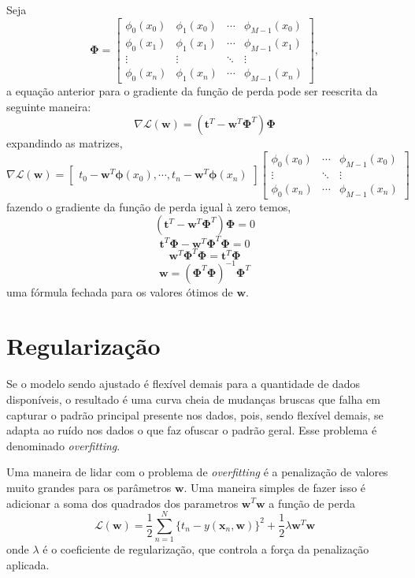 \documentclass{article}
\begin{document}
Seja
\[ \boldsymbol{\Phi} = \begin{bmatrix}
\phi_0(x_0) & \phi_1(x_0) & \dotsb & \phi_{M-1}(x_0) \\
\phi_0(x_1) & \phi_1(x_1) & \dotsb & \phi_{M-1}(x_1) \\
\vdots & \vdots & \ddots & \vdots \\
\phi_0(x_n) & \phi_1(x_n) & \dotsb & \phi_{M-1}(x_n)
\end{bmatrix},
\]
a equação anterior para o gradiente da função de perda pode ser reescrita da seguinte maneira:
\[
\nabla \mathcal{L}(\textbf{w}) = (\textbf{t}^T - \textbf{w}^T \boldsymbol{\Phi}^T) \boldsymbol{\Phi}
\]
expandindo as matrizes,
\[
\nabla \mathcal{L}(\textbf{w}) =
\begin{bmatrix} t_0 - \textbf{w}^T \boldsymbol{\phi}(x_0), \dotsb, t_n - \textbf{w}^T \boldsymbol{\phi}(x_n)\end{bmatrix}
\begin{bmatrix}
\phi_0(x_0) & \dotsb & \phi_{M-1}(x_0) \\
\vdots & \ddots & \vdots \\
\phi_0(x_n) & \dotsb & \phi_{M-1}(x_n)
\end{bmatrix}
\]
fazendo o gradiente da função de perda igual à zero temos,
\[
(\textbf{t}^T - \textbf{w}^T \boldsymbol{\Phi}^T) \boldsymbol{\Phi} = 0
\]
\[
\textbf{t}^T \boldsymbol{\Phi} - \textbf{w}^T \boldsymbol{\Phi}^T \boldsymbol{\Phi} = 0
\]
\[
\textbf{w}^T \boldsymbol{\Phi}^T \boldsymbol{\Phi} = \textbf{t}^T \boldsymbol{\Phi}
\]
\[
\textbf{w} = (\boldsymbol{\Phi}^T \boldsymbol{\Phi})^{-1} \boldsymbol{\Phi}^T
\]
uma fórmula fechada para os valores ótimos de \( \textbf{w} \).

\section{Regularização}

Se o modelo sendo ajustado é flexível demais para a quantidade de dados disponíveis, o resultado
é uma curva cheia de mudanças bruscas que falha em capturar o padrão principal presente nos dados, pois,
sendo flexível demais, se adapta ao ruído nos dados o que faz ofuscar o padrão geral. Esse problema é
denominado \emph{overfitting}.

Uma maneira de lidar com o problema de \emph{overfitting} é a penalização de valores muito grandes para
os parâmetros \( \textbf{w} \). Uma maneira simples de fazer isso é adicionar a soma dos quadrados dos
parametros \( \textbf{w}^T \textbf{w} \) a função de perda
\[ \mathcal{L}(\textbf{w}) = \frac{1}{2} \sum_{n=1}^{N} \{ t_n - y(\textbf{x}_n, \textbf{w})\}^2 + \frac{1}{2} \lambda \textbf{w}^T \textbf{w} \]
onde \( \lambda \) é o coeficiente de regularização, que controla a força da penalização aplicada.
\end{document}
